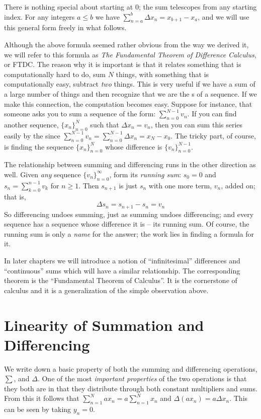 There is nothing special about starting at $0$; the sum telescopes from any
starting index. For any integers $a \le b$ we have
$\sum_{n=a}^{b} \Delta x_n = x_{b+1} - x_a$, and we will use this general
form freely in what follows.

Although the
above formula seemed rather obvious from the way we derived it, we will refer 
to this formula as {\it The Fundamental Theorem of Difference Calculus\/}, or FTDC.
The reason why it is important is that it relates something that is 
computationally hard to do, sum $N$ things, with something that is 
computationally easy, subtract {\it two\/} things. 
This is very useful 
if we have a sum of a large number of things and then recognize that we 
are  the s of a sequence. If we make this 
connection, the computation becomes easy. Suppose for instance, that someone 
asks you to sum a sequence of the form: 
$\sum_{n=0}^{N-1} v_n$. If you can find another sequence, $\{x_n\}_{n=0}^{N}$
such that $\Delta x_n = v_n$, then you can sum this series easily by the 
 since 
$\sum_{n=0}^{N-1} v_n = \sum_{n=0}^{N-1} \Delta x_n  = x_{N} - x_0$. The 
tricky part, of course, is finding the sequence $\{x_n\}_{n=0}^N$ 
whose difference is $\{v_n\}_{n=0}^{N-1}$. 

The relationship between summing and differencing runs in the other
direction as well. Given {\it any\/} sequence $\{v_n\}_{n=0}^{\infty}$, form
its {\it running sum\/}: $s_0 = 0$ and $s_n = \sum_{k=0}^{n-1} v_k$ for
$n \ge 1$. Then $s_{n+1}$ is just $s_n$ with one more term, $v_n$, added on;
that is,
$$
\Delta s_n = s_{n+1} - s_n = v_n
$$
So differencing undoes summing, just as summing undoes differencing; and
every sequence has a sequence whose difference it is -- its running sum.
Of course, the running sum is only a {\it name\/} for the answer; the work
lies in finding a formula for it.

In later chapters we will introduce a notion of ``infinitesimal'' differences
and ``continuous'' sums which will have a similar relationship. 
The corresponding theorem is the ``Fundamental Theorem of Calculus''. 
It is the cornerstone of calculus and it is a generalization of the
simple observation above.

\section{Linearity of Summation and Differencing}
We write down a basic property of both the summing and differencing operations, $\sum$, and $\Delta$.
One of the most {\it important properties\/} of the two operations is that they both 
are {\it {}\/} in that they distribute through 
both constant multipliers and sums.
\beginEnum
{}
\endEnum
From this it follows that $\sum_{n=1}^N a x_n = a \sum_{n=1}^N x_n$ and $\Delta (a x_n) = a \Delta x_n$. 
This can be seen by taking $y_n = 0$.

